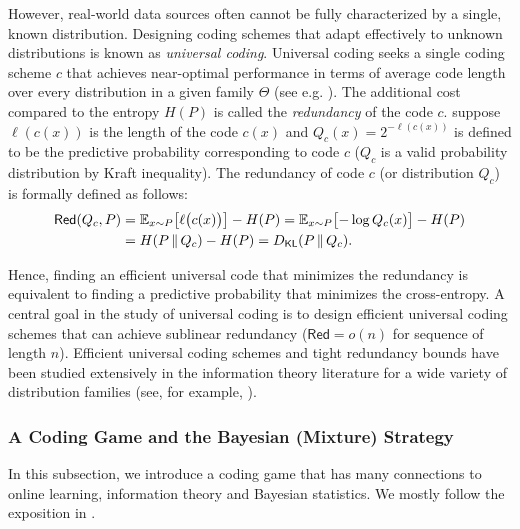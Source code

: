 \documentclass[11pt]{article}
\theoremstyle{plain}
\theoremstyle{definition}
\newcommand{\DKL}{D_{\mathsf{KL}}}
\newcommand{\redundency}{\mathsf{Red}}
\newcommand{\crossentropy}{H}
\begin{document}
However, real-world data sources often cannot be fully
characterized by a single, known distribution.
Designing coding schemes that adapt effectively to unknown distributions is known as \emph{universal coding}. 
Universal coding
seeks a single coding scheme \(c\) that achieves near-optimal performance
in terms of average code length over every distribution in a given family $\Theta$ (see e.g. \cite[Ch. 13]{cover2006elements}).
The additional cost compared to 
the entropy $H(P)$
is called the \emph{redundancy} of the code $c$.
suppose $\ell(c(x))$ is the length of the code $c(x)$
and $Q_c(x)=2^{-\ell(c(x))}$
is defined to be the predictive probability corresponding to code $c$ ($Q_c$ is a valid probability distribution by Kraft inequality).
The redundancy of code $c$ (or distribution $Q_c$) 
is formally defined as follows:
\begin{align}
\label{eq:reddef}
    \redundency(Q_c, P) & =
    \mathbb{E}_{x \sim P}
    \bigl[\ell\bigl(c(x)\bigr)\bigr]
    -H(P)
    =\mathbb{E}_{x \sim P}
    \bigl[-\log Q_c(x)\bigr]
    -H(P)
     \\
    & = \crossentropy(P\,\|\,Q_c)-H(P) 
    = \DKL(P\,\|\,Q_c). \notag
\end{align}

Hence, finding an efficient universal code that minimizes the redundancy is equivalent to finding a predictive probability that minimizes the cross-entropy.
A central goal in the study of universal coding
is to design efficient universal coding schemes
that can achieve sublinear redundancy
($\redundency = o(n)$ for sequence of length $n$).
Efficient universal coding schemes and tight redundancy bounds have been studied extensively in the information theory literature for a wide variety of distribution families (see, for example, \cite{cover2006elements,rissanen1984universal,clarke1994jeffreys,ziv1978compression,davisson1981efficient,atteson1999asymptotic,feder1996hierarchical}).


\subsubsection{A Coding Game and the Bayesian (Mixture) Strategy}
\label{sec:baye game}
In this subsection, we introduce a coding game
that has many connections to online learning, information theory and Bayesian statistics. 
We mostly follow the exposition in \cite{duchi2024lecture}.
\end{document}
